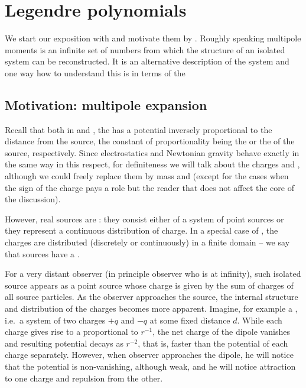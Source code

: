 \chapter{Legendre polynomials}
\label{ch:legendre}


We start our exposition with  and motivate them by . Roughly speaking multipole moments is an infinite set of numbers from which the structure of an isolated system can be reconstructed. It is an alternative description of the system and one way how to understand this is in terms of the 

\section{Motivation: multipole expansion}

Recall that both in  and , the  has a potential inversely proportional to the distance from the source, the constant of proportionality being the  or the  of the source, respectively. Since electrostatics and Newtonian gravity behave exactly in the same way in this respect, for definiteness we will talk about the charges and , although we could freely replace them by mass and  (except for the cases when the sign of the charge pays a role but the reader that does not affect the core of the discussion).

However, real sources are : they consist either of a system of point sources or they represent a continuous distribution of charge. In a special case of , the charges are distributed (discretely or continuously) in a finite domain -- we say that sources have a . 

For a very distant observer (in principle observer who is at infinity), such isolated source appears as a point source whose charge is given by the sum of charges of all source particles. As the observer approaches the source, the internal structure and distribution of the charges becomes more apparent. Imagine, for example a , i.e.\ a system of two charges $+q$ and $-q$ at some fixed distance $d$. While each charge gives rise to a  proportional to $r^{-1}$, the net charge of the dipole vanishes and resulting potential decays as $r^{-2}$, that is, faster than the potential of each charge separately. However, when observer approaches the dipole, he will notice that the potential is non-vanishing, although weak, and he will notice attraction to one charge and repulsion from the other. 


